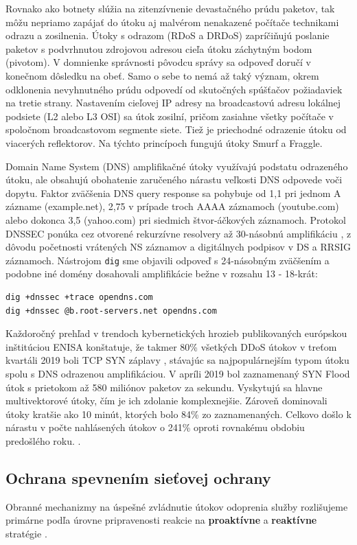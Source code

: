 \documentclass[12pt, a4paper]{article}
\begin{document}
Rovnako ako botnety slúžia na zitenzívnenie devastačného prúdu paketov, tak môžu nepriamo zapájať 
do útoku aj malvérom nenakazené počítače technikami odrazu a zosilnenia. Útoky s odrazom (RDoS a DRDoS) 
zapríčiňujú poslanie paketov s podvrhnutou zdrojovou adresou cieľa útoku záchytným bodom (pivotom).
V domnienke správnosti pôvodcu správy sa odpoveď doručí v konečnom dôsledku na obeť. Samo o sebe to nemá až 
taký význam, okrem odklonenia nevyhnutného prúdu odpovedí od skutočných spúšťačov požiadaviek na tretie
strany. Nastavením cieľovej IP adresy na broadcastovú adresu lokálnej podsiete (L2 alebo L3 OSI) sa
útok zosilní, pričom zasiahne všetky počítače v spoločnom broadcastovom segmente siete. Tiež je priechodné 
odrazenie útoku od viacerých reflektorov. Na týchto princípoch fungujú útoky Smurf a Fraggle.

Domain Name System (DNS) amplifikačné útoky využívajú podstatu odrazeného útoku, ale obsahujú obohatenie
zaručeného nárastu veľkosti DNS odpovede voči dopytu. Faktor zväčšenia DNS query response sa pohybuje
od 1,1 pri jednom A zázname (example.net), 2,75 v prípade troch AAAA záznamoch (youtube.com) alebo 
dokonca 3,5 (yahoo.com) pri siedmich štvor-áčkových záznamoch. Protokol DNSSEC ponúka
cez otvorené rekurzívne resolvery až 30-násobnú amplifikáciu \cite{csirt-ddos}, 
z dôvodu početnosti vrátených NS záznamov a digitálnych podpisov v DS a RRSIG záznamoch. 
Nástrojom \verb|dig| sme objavili odpoveď s 24-násobným zväčšením a podobne iné domény dosahovali
amplifikácie bežne v rozsahu 13 - 18-krát:
\begin{lstlisting}
dig +dnssec +trace opendns.com
dig +dnssec @b.root-servers.net opendns.com
\end{lstlisting}

Každoročný prehľad v trendoch kybernetických hrozieb publikovaných európskou inštitúciou ENISA
konštatuje, že takmer 80\% všetkých DDoS útokov v treťom kvartáli 2019 boli TCP SYN záplavy 
\cite{enisa-ddos}, stávajúc sa najpopulárnejším typom útoku spolu s DNS odrazenou amplifikáciou. 
V apríli 2019 bol zaznamenaný SYN Flood útok s prietokom až 580 miliónov paketov za sekundu. Vyskytujú
sa hlavne multivektorové útoky, čím je ich zdolanie komplexnejšie. Zároveň dominovali útoky kratšie
ako 10 minút, ktorých bolo 84\% zo zaznamenaných. Celkovo došlo k nárastu v počte nahlásených útokov
o 241\% oproti rovnakému obdobiu predošlého roku. \cite{enisa-ddos}.

\subsection{Ochrana spevnením sieťovej ochrany}
Obranné mechanizmy na úspešné zvládnutie útokov odoprenia služby rozlišujeme primárne podľa
úrovne pripravenosti reakcie na \textbf{proaktívne} a \textbf{reaktívne} stratégie
\cite{ddos-anatomy-2004}.
\end{document}
